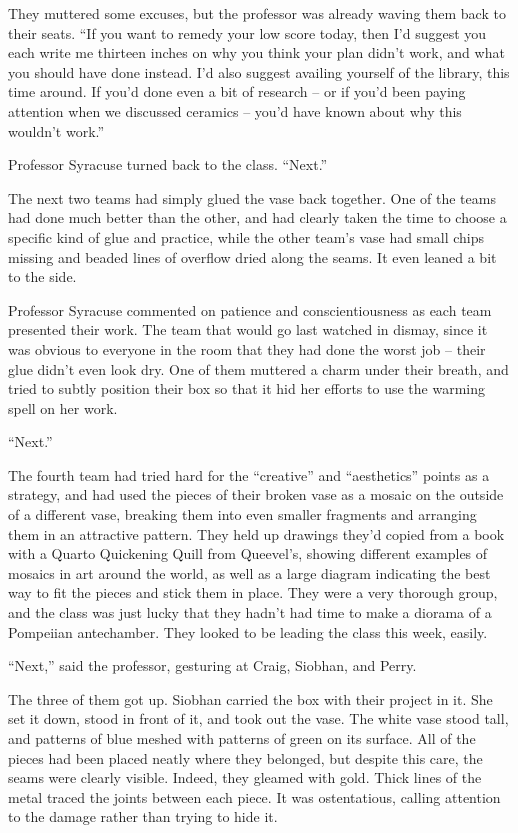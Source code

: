 They muttered some excuses, but the professor was already waving them
back to their seats. ``If you want to remedy your low score today, then
I'd suggest you each write me thirteen inches on why you think your plan
didn't work, and what you should have done instead. I'd also suggest
availing yourself of the library, this time around. If you'd done even a
bit of research -- or if you'd been paying attention when we discussed
ceramics -- you'd have known about why this wouldn't work.''

Professor Syracuse turned back to the class. ``Next.''

The next two teams had simply glued the vase back together. One of the
teams had done much better than the other, and had clearly taken the
time to choose a specific kind of glue and practice, while the other
team's vase had small chips missing and beaded lines of overflow dried
along the seams. It even leaned a bit to the side.

Professor Syracuse commented on patience and conscientiousness as each
team presented their work. The team that would go last watched in
dismay, since it was obvious to everyone in the room that they had done
the worst job -- their glue didn't even look dry. One of them muttered a
charm under their breath, and tried to subtly position their box so that
it hid her efforts to use the warming spell on her work.

``Next.''

The fourth team had tried hard for the ``creative'' and ``aesthetics''
points as a strategy, and had used the pieces of their broken vase as a
mosaic on the outside of a different vase, breaking them into even
smaller fragments and arranging them in an attractive pattern. They held
up drawings they'd copied from a book with a Quarto Quickening Quill
from Queevel's, showing different examples of mosaics in art around the
world, as well as a large diagram indicating the best way to fit the
pieces and stick them in place. They were a very thorough group, and the
class was just lucky that they hadn't had time to make a diorama of a
Pompeiian antechamber. They looked to be leading the class this week,
easily.

``Next,'' said the professor, gesturing at Craig, Siobhan, and Perry.

The three of them got up. Siobhan carried the box with their project in
it. She set it down, stood in front of it, and took out the vase. The
white vase stood tall, and patterns of blue meshed with patterns of
green on its surface. All of the pieces had been placed neatly where
they belonged, but despite this care, the seams were clearly visible.
Indeed, they gleamed with gold. Thick lines of the metal traced the
joints between each piece. It was ostentatious, calling attention to the
damage rather than trying to hide it.

